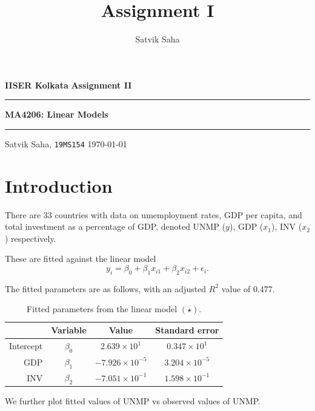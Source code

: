 \documentclass[10pt]{article}
\title{Assignment I}
\author{Satvik Saha}
\date{}
\begin{document}
    \noindent\textbf{IISER Kolkata} \hfill \textbf{Assignment II}
    \vspace{3pt}
    \hrule
    \vspace{3pt}
    \begin{center}
    \LARGE{\textbf{MA4206: Linear Models}}
    \end{center}
    \vspace{3pt}
    \hrule
    \vspace{3pt}
    Satvik Saha, \texttt{19MS154} \hfill \today
    \vspace{20pt}

    \setlength{\parskip}{1em}


    \section{Introduction}

    There are 33 countries with data on umemployment rates, GDP per capita, and total
    investment as a percentage of GDP, denoted UNMP ($y$), GDP ($x_1$), INV ($x_2$)
    respectively.


    These are fitted against the linear model \[
        y_i = \beta_0 + \beta_1 x_{i1} + \beta_2 x_{i2} + \epsilon_i. \tag{$\star$}
    \]

    The fitted parameters are as follows, with an adjusted $R^2$ value of 0.477.

    \begin{table}[H]
        \centering
        \caption{Fitted parameters from the linear model $(\star)$.}
        \vspace{1em}
        \label{tab:parameters}
        \begin{tabular}{rccc}
            \hline
                & Variable & Value & Standard error \\\hline
            Intercept & $\beta_0$ & $2.639 \times 10^1$ &  $0.347 \times 10^1$ \\
            GDP & $\beta_1$ & $-7.926 \times 10^{-5}$ & $3.204 \times 10^{-5}$ \\
            INV & $\beta_2$ & $-7.051 \times 10^{-1}$ & $1.598 \times 10^{-1}$ \\\hline
        \end{tabular}
    \end{table}

    We further plot fitted values of UNMP vs observed values of UNMP.
\end{document}
